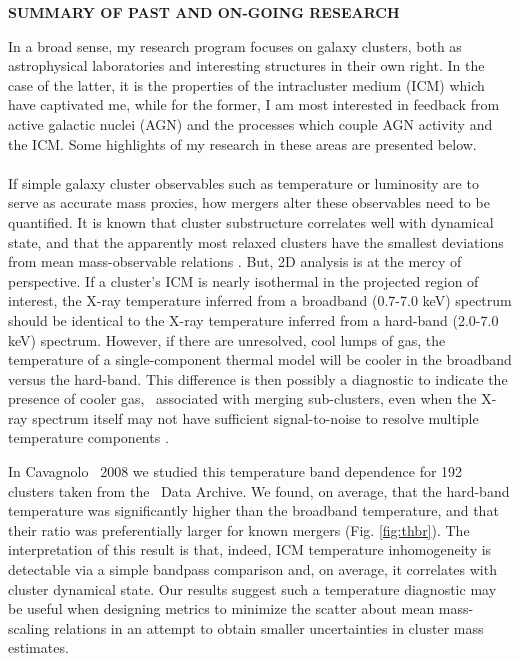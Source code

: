 \documentclass[letterpaper,12pt]{article}
\begin{document}
\begin{center}
  {\bf\uppercase{Summary of Past and On-going Research}}
\end{center}

In a broad sense, my research program focuses on galaxy clusters, both
as astrophysical laboratories and interesting structures in their own
right. In the case of the latter, it is the properties of the
intracluster medium (ICM) which have captivated me, while for the
former, I am most interested in feedback from active galactic nuclei
(AGN) and the processes which couple AGN activity and the ICM. Some
highlights of my research in these areas are presented below.\\

\\
\indent If simple galaxy cluster observables such as temperature or
luminosity are to serve as accurate mass proxies, how mergers alter
these observables need to be quantified. It is known that cluster
substructure correlates well with dynamical state, and that the
apparently most relaxed clusters have the smallest deviations from
mean mass-observable relations \citep[\eg][]{VV08}. But, 2D analysis
is at the mercy of perspective. If a cluster's ICM is nearly
isothermal in the projected region of interest, the X-ray temperature
inferred from a broadband (0.7-7.0 keV) spectrum should be identical
to the X-ray temperature inferred from a hard-band (2.0-7.0 keV)
spectrum. However, if there are unresolved, cool lumps of gas, the
temperature of a single-component thermal model will be cooler in the
broadband versus the hard-band. This difference is then possibly a
diagnostic to indicate the presence of cooler gas, \eg\ associated
with merging sub-clusters, even when the X-ray spectrum itself may not
have sufficient signal-to-noise to resolve multiple temperature
components \citep{me01}.

In Cavagnolo \etal\ 2008 \citep{xrayband} we studied this temperature
band dependence for 192 clusters taken from the \chandra\ Data
Archive. We found, on average, that the hard-band temperature was
significantly higher than the broadband temperature, and that their
ratio was preferentially larger for known mergers (Fig.
\ref{fig:thbr}). The interpretation of this result is that, indeed,
ICM temperature inhomogeneity is detectable via a simple bandpass
comparison and, on average, it correlates with cluster dynamical
state. Our results suggest such a temperature diagnostic may be useful
when designing metrics to minimize the scatter about mean mass-scaling
relations in an attempt to obtain smaller uncertainties in cluster
mass estimates.\\
\end{document}
